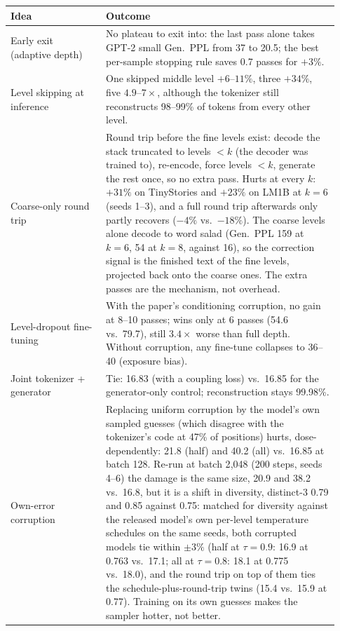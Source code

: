 \documentclass[10pt]{article}
\begin{document}
\begin{table}[!htb]
\centering
\small
\begin{tabular}{p{0.27\linewidth}p{0.66\linewidth}}
\toprule
Idea & Outcome \\
\midrule
Early exit (adaptive depth) & No plateau to exit into: the last pass alone takes GPT-2 small Gen.\ PPL from 37 to 20.5; the best per-sample stopping rule saves 0.7 passes for $+3\%$. \\
Level skipping at inference & One skipped middle level $+6$--$11\%$, three $+34\%$, five $4.9$--$7\times$, although the tokenizer still reconstructs 98--99\% of tokens from every other level. \\
Coarse-only round trip & Round trip before the fine levels exist: decode the stack truncated to levels $<k$ (the decoder was trained to), re-encode, force levels $<k$, generate the rest once, so no extra pass. Hurts at every $k$: $+31\%$ on TinyStories and $+23\%$ on LM1B at $k{=}6$ (seeds 1--3), and a full round trip afterwards only partly recovers ($-4\%$ vs.\ $-18\%$). The coarse levels alone decode to word salad (Gen.\ PPL 159 at $k{=}6$, 54 at $k{=}8$, against 16), so the correction signal is the finished text of the fine levels, projected back onto the coarse ones. The extra passes are the mechanism, not overhead. \\
Level-dropout fine-tuning & With the paper's conditioning corruption, no gain at 8--10 passes; wins only at 6 passes (54.6 vs.\ 79.7), still $3.4\times$ worse than full depth. Without corruption, any fine-tune collapses to 36--40 (exposure bias). \\
Joint tokenizer + generator & Tie: 16.83 (with a coupling loss) vs.\ 16.85 for the generator-only control; reconstruction stays 99.98\%. \\
Own-error corruption & Replacing uniform corruption by the model's own sampled guesses (which disagree with the tokenizer's code at 47\% of positions) hurts, dose-dependently: 21.8 (half) and 40.2 (all) vs.\ 16.85 at batch 128. Re-run at batch 2{,}048 (200 steps, seeds 4--6) the damage is the same size, 20.9 and 38.2 vs.\ 16.8, but it is a shift in diversity, distinct-3 0.79 and 0.85 against 0.75: matched for diversity against the released model's own per-level temperature schedules on the same seeds, both corrupted models tie within $\pm3\%$ (half at $\tau{=}0.9$: 16.9 at 0.763 vs.\ 17.1; all at $\tau{=}0.8$: 18.1 at 0.775 vs.\ 18.0), and the round trip on top of them ties the schedule-plus-round-trip twins (15.4 vs.\ 15.9 at 0.77). Training on its own guesses makes the sampler hotter, not better. \\

\end{tabular}
\end{table}
\end{document}
